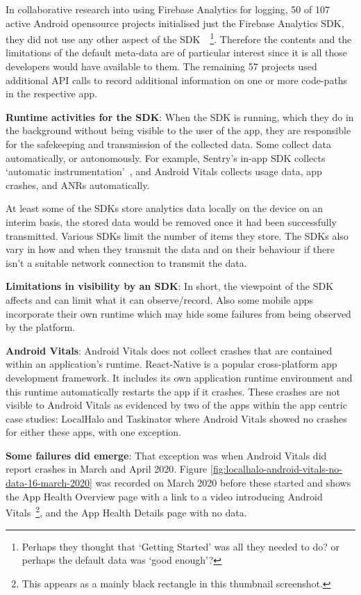 In collaborative research into using Firebase Analytics for logging, 50 of 107 active Android opensource projects initialised just the Firebase Analytics SDK, they did not use any other aspect of the SDK~\citep{harty2021_logging_practices_with_mobile_analytics}~\footnote{Perhaps they thought that `Getting Started' was all they needed to do? or perhaps the default data was `good enough'?}. Therefore the contents and the limitations of the default meta-data are of particular interest since it is all those developers would have available to them. The remaining 57 projects used additional API calls to record additional information on one or more code-paths in the respective app.

\textbf{Runtime activities for the SDK}: 
When the SDK is running, which they do in the background without being visible to the user of the app, they are responsible for the safekeeping and transmission of the collected data. Some collect data automatically, or autonomously. For example, Sentry's in-app SDK collects `automatic instrumentation'~\citep{sentry2021_mobile_vitals_four_metrics_every_mobile_developer_should_care_about}, and Android Vitals collects usage data, app crashes, and ANRs automatically.

At least some of the SDKs store analytics data locally on the device on an interim basis, the stored data would be removed once it had been successfully transmitted. Various SDKs limit the number of items they store. The SDKs also vary in how and when they transmit the data and on their behaviour if there isn't a suitable network connection to transmit the data.

\textbf{Limitations in visibility by an SDK}: 
In short, the viewpoint of the SDK affects and can limit what it can observe/record. Also some mobile apps incorporate their own runtime which may hide some failures from being observed by the platform.

\textbf{Android Vitals}: 
Android Vitals does not collect crashes that are contained within an application's runtime. React-Native is a popular cross-platform app development framework. It includes its own application runtime environment and this runtime automatically restarts the app if it crashes. These crashes are not visible to Android Vitals as evidenced by two of the apps within the app centric case studies: LocalHalo and Taskinator where Android Vitals showed no crashes for either these apps, with one exception. 

\textbf{Some failures did emerge}:
That exception was when Android Vitals did report crashes in March and April 2020. Figure \ref{fig:localhalo-android-vitals-no-data-16-march-2020} was recorded on  March 2020 before these started and shows the App Health Overview page with a link to a video introducing Android Vitals~\footnote{This appears as a mainly black rectangle in this thumbnail screenshot.}, and the App Health Details page with no data.

